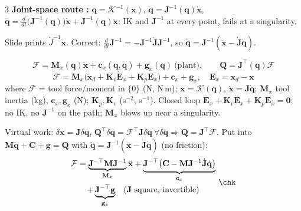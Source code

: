 \begin{multicols}{3}
\textbf{Joint-space route :} $\mathbf q=\mathcal K^{-1}(\mathbf x)$, $\dot{\mathbf q}=\mathbf J^{-1}(\mathbf q)\dot{\mathbf x}$, $\ddot{\mathbf q}=\tfrac{d}{dt}\big(\mathbf J^{-1}(\mathbf q)\big)\dot{\mathbf x}+\mathbf J^{-1}(\mathbf q)\ddot{\mathbf x}$: IK and $\mathbf J^{-1}$ at every point, fails at a singularity.
\begin{slideerr}[p.\,31]
Slide prints $\dot J^{-1}\dot{\mathbf x}$. Correct: $\tfrac d{dt}\mathbf J^{-1}=-\mathbf J^{-1}\dot{\mathbf J}\mathbf J^{-1}$, so $\ddot{\mathbf q}=\mathbf J^{-1}(\ddot{\mathbf x}-\dot{\mathbf J}\dot{\mathbf q})$. \chk
\end{slideerr}
\begin{fbx}\label{w9:cart}
\[\mathcal F=\mathbf M_x(\mathbf q)\ddot{\mathbf x}+\mathbf c_x(\mathbf q,\dot{\mathbf q})+\mathbf g_x(\mathbf q)\ \text{(plant)},\qquad \mathbf Q=\mathbf J^\top(\mathbf q)\mathcal F\]
\[\mathcal F=\mathbf M_x\big(\ddot{\mathbf x}_d+\mathbf K_v\dot{\mathbf E}_x+\mathbf K_p\mathbf E_x\big)+\mathbf c_x+\mathbf g_x,\quad \mathbf E_x=\mathbf x_d-\mathbf x\]
where $\mathcal F$ = tool force/moment in $\{0\}$ (N, N\,m); $\mathbf x=\mathcal K(\mathbf q)$, $\dot{\mathbf x}=\mathbf J\dot{\mathbf q}$; $\mathbf M_x$ tool inertia (kg), $\mathbf c_x,\mathbf g_x$ (N); $\mathbf K_p,\mathbf K_v$ (s$^{-2}$, s$^{-1}$). Closed loop $\ddot{\mathbf E}_x+\mathbf K_v\dot{\mathbf E}_x+\mathbf K_p\mathbf E_x=\mathbf 0$; no IK, no $\mathbf J^{-1}$ on the path; $\mathbf M_x$ blows up near a singularity.
\end{fbx}
\begin{deriv}[$\mathbf Q=\mathbf J^\top\mathcal F$ and $\mathbf M_x,\mathbf c_x,\mathbf g_x$ \added]
Virtual work: $\delta\mathbf x=\mathbf J\delta\mathbf q$, $\mathbf Q^\top\delta\mathbf q=\mathcal F^\top\mathbf J\delta\mathbf q\ \forall\delta\mathbf q\Rightarrow\mathbf Q=\mathbf J^\top\mathcal F$. Put into $\mathbf M\ddot{\mathbf q}+\mathbf C+\mathbf g=\mathbf Q$ with $\ddot{\mathbf q}=\mathbf J^{-1}(\ddot{\mathbf x}-\dot{\mathbf J}\dot{\mathbf q})$ (no friction):
\[\begin{gathered}\mathcal F=\underbrace{\mathbf J^{-\top}\mathbf M\mathbf J^{-1}}_{\mathbf M_x}\ddot{\mathbf x}+\underbrace{\mathbf J^{-\top}\big(\mathbf C-\mathbf M\mathbf J^{-1}\dot{\mathbf J}\dot{\mathbf q}\big)}_{\mathbf c_x}\\+\underbrace{\mathbf J^{-\top}\mathbf g}_{\mathbf g_x}\quad(\mathbf J\ \text{square, invertible})\end{gathered}\ \chk\]

\end{deriv}
\end{multicols}
